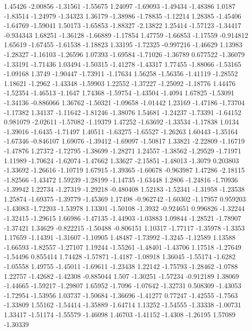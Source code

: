 \documentclass[9pt]{article}
\theoremstyle{plain}
\theoremstyle{definition}
\theoremstyle{remark}
\numberwithin{equation}{section}
\begin{document}
1.45426
-2.00856
-1.31561
-1.55675
1.24097
-1.69093
-1.49434
-1.48386
1.0187
-1.83514
-1.24979
-1.34323
1.36179
-1.38986
-1.78835
-1.12214
1.28385
-1.45406
-1.64769
-1.59041
1.50173
-1.65853
-1.88327
-2.13822
1.25414
-1.57123
-1.34417
-0.934343
1.68251
-1.36128
-1.66889
-1.17854
1.47759
-1.66853
-1.17559
-0.914812
1.65619
-1.67455
-1.61538
-1.18823
1.33195
-1.72325
-0.997216
-1.46629
1.13983
-1.28327
-1.16103
-1.26596
1.07393
-1.69584
-1.71026
-1.36789
0.677522
-1.36079
-1.33191
-1.71436
1.03494
-1.50315
-1.41278
-1.43317
1.77455
-1.88066
-1.53165
-1.09168
1.3749
-1.90447
-1.73911
-1.17634
1.56258
-1.56356
-1.41119
-1.28552
1.18621
-1.2962
-1.43348
-1.59903
1.22552
-1.37227
-1.25092
-1.18776
1.44476
-1.52354
-1.46513
-1.1647
1.74368
-1.59754
-1.43504
-1.4094
1.67825
-1.53091
-1.34136
-0.886066
1.36762
-1.50321
-1.09658
-1.01442
1.23169
-1.47186
-1.73704
-1.17382
1.34137
-1.11642
-1.81246
-1.38076
1.54681
-1.24237
-1.73391
-1.64152
0.981079
-2.02611
-1.57082
-1.19379
1.47252
-1.63692
-1.33534
-1.17838
1.0134
-1.39016
-1.6435
-1.71497
1.40511
-1.63275
-1.65527
-1.26263
1.60443
-1.35164
-1.67346
-0.846107
1.69076
-1.39412
-1.69097
-1.50817
1.33821
-2.22809
-1.16719
-1.47876
1.27372
-1.72795
-1.38699
-1.28271
1.24557
-1.38562
-1.29529
-1.71971
1.11989
-1.70624
-1.62074
-1.47662
1.33627
-2.15851
-1.48013
-1.3079
0.203803
-1.33692
-1.26616
-1.10719
1.67915
-1.39365
-1.60678
-0.963987
1.47286
-2.18115
-1.82566
-1.43472
1.59239
-1.28199
-1.14735
-1.63448
1.2806
-1.24816
-1.70936
-1.39942
1.22734
-1.27319
-1.29218
-0.480408
1.52183
-1.52341
-1.31958
-1.23538
1.25874
-1.69375
-1.39779
-1.45369
1.17498
-0.962742
-1.60302
-1.17957
0.959203
-1.43083
-1.72203
-1.53978
1.13301
-1.50108
-1.3932
-0.924651
0.996826
-1.32244
-1.32415
-1.29615
1.66986
-1.47135
-1.44903
-1.03883
1.09844
-1.28521
-1.78907
-1.37421
1.34629
-0.822215
-1.50488
-0.806151
1.10317
-1.77117
-1.35978
-1.3353
1.17659
-1.14391
-1.31607
-1.10905
1.48487
-1.73992
-1.3245
-1.12589
1.13588
-1.66593
-1.82557
-1.27107
1.19244
-1.55261
-1.48401
-1.43706
1.17518
-1.27649
-1.54496
0.855414
1.74428
-1.57871
-1.4187
-1.08918
1.36045
-1.55174
-1.6282
-1.05558
1.49755
-1.45011
-1.69611
-1.23438
1.22142
-1.75793
-1.28462
-1.0788
1.22757
-1.42682
-1.42308
-0.885044
1.507
-1.30251
-1.57234
-0.912189
1.38069
-1.44665
-1.59217
-1.29807
1.65952
-1.7096
-1.07642
-1.32731
0.508309
-1.43053
-1.72954
-1.53956
1.03737
-1.50684
-1.36696
-1.41277
0.77247
-1.42555
-1.7563
-1.33809
1.55162
-1.54414
-1.35889
-1.64714
1.13252
-1.54555
-1.33338
-1.00731
1.33417
-1.51174
-1.55579
-1.46098
1.46703
-1.41152
-1.4308
-1.26195
1.57089
-1.30339
\end{document}
